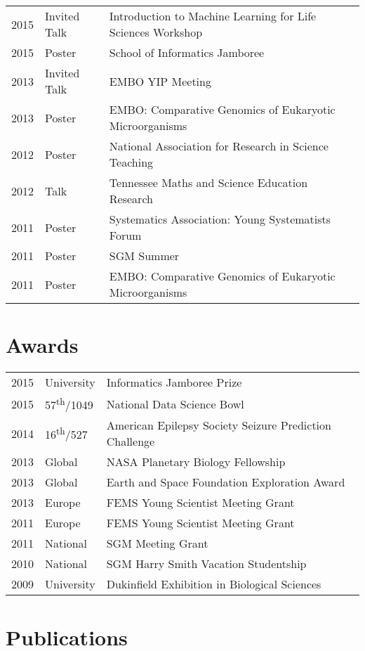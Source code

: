 \documentclass[]{Finlay_Maguire_CV}
\begin{document}
\begin{minipage}[t]{0.66\textwidth}
\begin{tabular}{rll}
2015 & Invited Talk &  Introduction to Machine Learning for Life Sciences Workshop\\
2015 & Poster & School of Informatics Jamboree\\
2013 & Invited Talk & EMBO YIP Meeting \\
2013 & Poster & EMBO: Comparative Genomics of Eukaryotic Microorganisms\\
2012 & Poster & National Association for Research in Science Teaching\\
2012 & Talk & Tennessee Maths and Science Education Research\\
2011 & Poster & Systematics Association: Young Systematists Forum\\
2011 & Poster & SGM Summer \\
2011 & Poster & EMBO: Comparative Genomics of Eukaryotic Microorganisms\\
\end{tabular}
\sectionsep


\section{Awards} 
\begin{tabular}{rll}
2015	     & University  & Informatics Jamboree Prize \\
2015         & 57\textsuperscript{th}/1049 & National Data Science Bowl\\
2014         & 16\textsuperscript{th}/527 & American Epilepsy Society Seizure Prediction Challenge \\
2013	     & Global & NASA Planetary Biology Fellowship \\
2013	     & Global & Earth and Space Foundation Exploration Award\\
2013     & Europe & FEMS Young Scientist Meeting Grant \\
2011     & Europe & FEMS Young Scientist Meeting Grant \\
2011     & National & SGM Meeting Grant\\
2010     & National & SGM Harry Smith Vacation Studentship\\
2009     & University & Dukinfield Exhibition in Biological Sciences\\
\end{tabular}
\sectionsep


\section{Publications} 
%
%

\end{minipage} 
\end{document}
